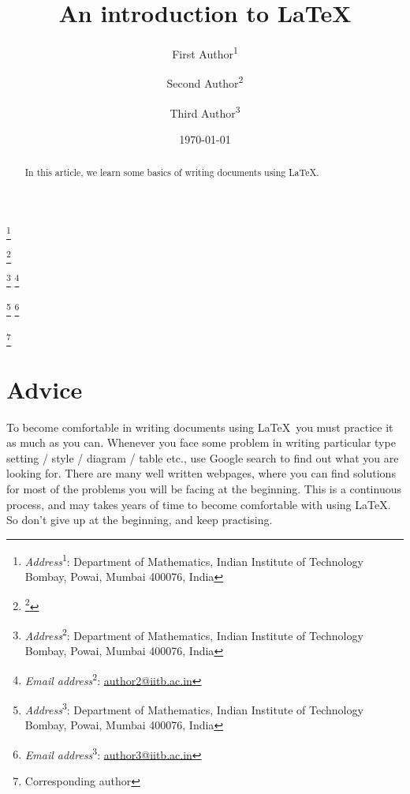\documentclass[11pt,leqno]{amsart}
\makeatletter
\numberwithin{equation}{subsection}
\theoremstyle{definition}
\newenvironment{nouppercase}{%
	\let\uppercase\relax%
	\renewcommand{\uppercasenonmath}[1]{}}{}
\newcommand\thankssymb[1]{\textsuperscript{\@fnsymbol{#1}}}
\newcommand\thanksnum[1]{\textsuperscript{#1}}
\renewcommand{\email}[2][1]{\thanks{\textit{Email address}#1: \href{mailto:#2}{#2}}}
\renewcommand{\address}[2][1]{\thanks{\textit{Address}#1: #2}}
\newcommand{\corauth}[2][1]{\thanks{#2Corresponding author}}
\makeatother
\begin{document}
\baselineskip=15.5pt

\title[Basics of \LaTeX]{\Huge An introduction to \LaTeX} 

\author[F. Author]{\large First Author\thanksnum{1}\thankssymb{1}}

\address[\thanksnum{1}]{Department of Mathematics, Indian Institute of Technology Bombay, Powai, Mumbai 400076, India}

\thanks{\email[\thanksnum{1}]{author1@iitb.ac.in}} 

\author[S. Author]{Second Author\thanksnum{2}} 
\address[\thanksnum{2}]{Department of Mathematics, Indian Institute of Technology Bombay, Powai, Mumbai 400076, India}
\email[\thanksnum{2}]{author2@iitb.ac.in}

\author[T. Author]{Third Author\thanksnum{3}} 
\address[\thanksnum{3}]{Department of Mathematics, Indian Institute of Technology Bombay, Powai, Mumbai 400076, India}
\email[\thanksnum{3}]{author3@iitb.ac.in}

\corauth[]{\thankssymb{1}} 


\keywords{\LaTeX} 

\date{\today}


\begin{nouppercase}
	\maketitle
\end{nouppercase}

\tableofcontents

\begin{abstract}
In this article, we learn some basics of writing documents using \LaTeX. 
\end{abstract}


\section{Advice} 
To become comfortable in writing documents using \LaTeX\, you must practice it as much as you can. 
Whenever you face some problem in writing particular type setting / style / diagram / table etc., 
use Google search to find out what you are looking for. There are many well written webpages, 
where you can find solutions for most of the problems you will be facing at the beginning. 
This is a continuous process, and may takes years of time to become comfortable with using \LaTeX. 
So don't give up at the beginning, and keep practising. 
\end{document}
